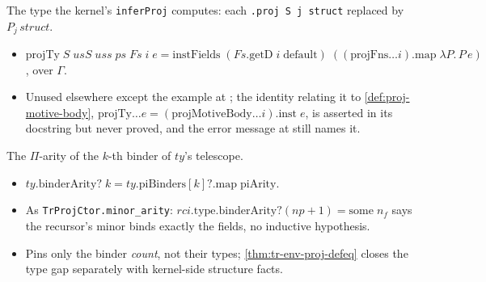 \begin{definition}
  \label{def:proj-ty}
  \leanok

   The type the kernel's \texttt{inferProj} computes: each \texttt{.proj S j
  struct} replaced by $P_j\,struct$.
  \begin{itemize}
  \item $\mathrm{projTy}\;S\;usS\;uss\;ps\;Fs\;i\;e = \mathrm{instFields}\;
        (Fs.\mathrm{getD}\;i\;\mathrm{default})\;((\mathrm{projFns}\dots i).\mathrm{map}\;\lambda
        P.\,P\,e)$, over $\Gamma$.
  \item {} Unused elsewhere except the example at
        ; the identity relating it to
        \ref{def:proj-motive-body}, $\mathrm{projTy}\dots e =
        (\mathrm{projMotiveBody}\dots i).\mathrm{inst}\;e$, is asserted in its docstring but never
        proved, and the error message at  still names
        it.
  \end{itemize}
\end{definition}

\begin{definition}
  \label{def:proj-binder-arity}
  \leanok

   The $\Pi$-arity of the $k$-th binder of $ty$'s telescope.
  \begin{itemize}
  \item $ty.\mathrm{binderArity?}\;k = ty.\mathrm{piBinders}[k]?.\mathrm{map}\;\mathrm{piArity}$.
  \item As \texttt{TrProjCtor.minor\_arity}: $rci.\mathrm{type}.\mathrm{binderArity?}(np+1) =
        \mathrm{some}\;n_f$ says the recursor's minor binds exactly the fields, no inductive
        hypothesis.
  \item {} Pins only the binder \emph{count}, not their types;
        \ref{thm:tr-env-proj-defeq} closes the type gap separately with kernel-side structure
        facts.
  \end{itemize}
\end{definition}

